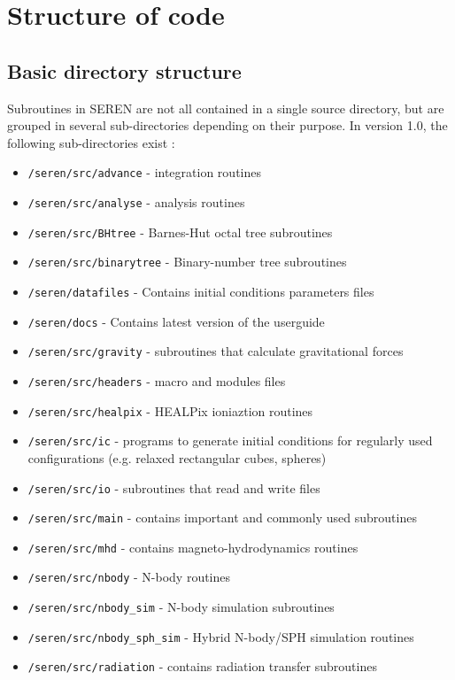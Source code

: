 \documentclass[a4paper]{article}
\newcommand{\NAME}{SEREN }
\newcommand{\name}{seren}
\newcommand{\var}[1]{\texttt{#1}}
\begin{document}
\section{Structure of code}


\subsection{Basic directory structure}
Subroutines in \NAME are not all contained in a single source directory, 
but are grouped in several sub-directories depending on their purpose. 
In version 1.0, the following sub-directories exist : 
\begin{itemize}
\item \var{/\name/src/advance} - integration routines
\item \var{/\name/src/analyse} - analysis routines
\item \var{/\name/src/BHtree} - Barnes-Hut octal tree subroutines
\item \var{/\name/src/binarytree} - Binary-number tree subroutines
\item \var{/\name/datafiles} - Contains initial conditions parameters files
\item \var{/\name/docs} - Contains latest version of the userguide
\item \var{/\name/src/gravity} - subroutines that calculate gravitational forces
\item \var{/\name/src/headers} - macro and modules files
\item \var{/\name/src/healpix} - HEALPix ioniaztion routines
\item \var{/\name/src/ic} - programs to generate initial conditions for 
regularly used configurations (e.g. relaxed rectangular cubes, 
spheres)
\item \var{/\name/src/io} - subroutines that read and write files
\item \var{/\name/src/main} - contains important and commonly used 
subroutines
\item \var{/\name/src/mhd} - contains magneto-hydrodynamics routines
\item \var{/\name/src/nbody} - N-body routines
\item \var{/\name/src/nbody\_sim} - N-body simulation subroutines
\item \var{/\name/src/nbody\_sph\_sim} - Hybrid N-body/SPH simulation routines
\item \var{/\name/src/radiation} - contains radiation transfer subroutines

\end{itemize}
\end{document}
